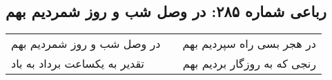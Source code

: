 \begin{center}
\section*{رباعی شماره ۲۸۵: در وصل شب و روز شمردیم بهم}
\label{sec:sh285}
\begin{longtable}{l p{0.5cm} r}
در وصل شب و روز شمردیم بهم
&&
در هجر بسی راه سپردیم بهم
\\
تقدیر به یکساعت برداد به باد
&&
رنجی که به روزگار بردیم بهم
\\
\end{longtable}
\end{center}

